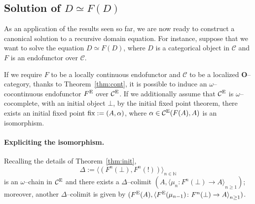 \subsection{Solution of \(D \simeq F(D)\)}

As an application of the results seen so far, we are now ready to construct a canonical solution to a recursive domain equation.
For instance, suppose that we want to solve the equation \(D \simeq F(D)\), where \(D\) is a categorical object in \(\mathcal{C}\) and \(F\) is an endofunctor over \(\mathcal{C}\).

If we require \(F\) to be a locally continuous endofunctor and \(\mathcal{C}\) to be a localized \(\mathbf{O}\)--category, thanks to Theorem~\ref{thm:cont}, it is possible to induce an \(\omega\)--cocontinuous endofunctor \(F^\textup{E}\) over \(\mathcal{C}^\textup{E}\).
If we additionally assume that \(\mathcal{C}^\textup{E}\) is \(\omega\)--cocomplete, with an initial object \(\bot\), by the initial fixed point theorem, there exists an initial fixed point \(\operatorname{fix} := (A,\alpha)\), where \(\alpha \in \mathcal{C}^\textup{E}(F(A), A)\) is an isomorphism.

\paragraph{Expliciting the isomorphism.}
Recalling the details of Theorem~\ref{thm:init},
\begin{equation*}
  \Delta := {\langle(F^n(\bot),F^n(!))\rangle}_{n \in \mathbb{N}}
\end{equation*}
is an \(\omega\)--chain in \(\mathcal{C}^\textup{E}\) and there exists a \(\Delta\)--colimit \((A, {\langle \mu_n \colon F^n(\bot) \to A \rangle}_{n \ge 1})\); moreover, another \(\Delta\)--colimit is given by \((F^\textup{E}(A), {\langle F^\textup{E}(\mu_{n-1}) \colon F^n(\bot) \to A \rangle}_{n \ge 1})\).

